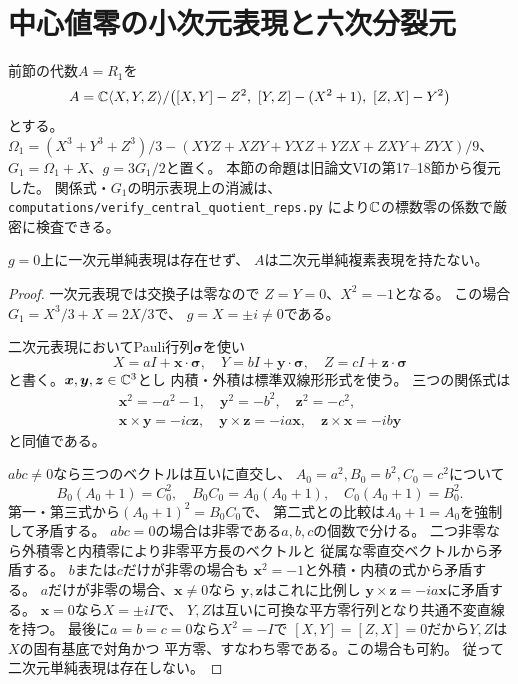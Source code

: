 \section{中心値零の小次元表現と六次分裂元}
\label{sec:central-quotient-representations}

前節の代数$A=R_1$を
\[
 A=\mathbb C\langle X,Y,Z\rangle/
 \bigl([X,Y]-Z^2,\ [Y,Z]-(X^2+1),\ [Z,X]-Y^2\bigr)
\]
とする。$\Omega_1=(X^3+Y^3+Z^3)/3
-(XYZ+XZY+YXZ+YZX+ZXY+ZYX)/9$、
$G_1=\Omega_1+X$、$g=3G_1/2$と置く。
本節の命題は旧論文VIの第17--18節から復元した。
関係式・$G_1$の明示表現上の消滅は、
\texttt{computations/verify\_central\_quotient\_reps.py}
により$\mathbb C$の標数零の係数で厳密に検査できる。

\begin{proposition}[一次・二次元単純表現の不存在]
\label{prop:local-no-small-simples}
$g=0$上に一次元単純表現は存在せず、
$A$は二次元単純複素表現を持たない。
\end{proposition}
\begin{proof}
一次元表現では交換子は零なので
$Z=Y=0$、$X^2=-1$となる。
この場合$G_1=X^3/3+X=2X/3$で、
$g=X=\pm i\ne0$である。

二次元表現においてPauli行列$\boldsymbol{\sigma}$を使い
\[
 X=aI+\boldsymbol x\cdot\boldsymbol{\sigma},\quad
 Y=bI+\boldsymbol y\cdot\boldsymbol{\sigma},\quad
 Z=cI+\boldsymbol z\cdot\boldsymbol{\sigma}
\]
と書く。$\boldsymbol{x},\boldsymbol{y},\boldsymbol{z}\in\mathbb C^3$とし
内積・外積は標準双線形形式を使う。
三つの関係式は
\[
 \begin{gathered}
 \boldsymbol x^2=-a^2-1,\quad
 \boldsymbol y^2=-b^2,\quad
 \boldsymbol z^2=-c^2,\\
 \boldsymbol x\times\boldsymbol y=-ic\boldsymbol z,\quad
 \boldsymbol y\times\boldsymbol z=-ia\boldsymbol x,\quad
 \boldsymbol z\times\boldsymbol x=-ib\boldsymbol y
 \end{gathered}
\]
と同値である。

$abc\ne0$なら三つのベクトルは互いに直交し、
$A_0=a^2,B_0=b^2,C_0=c^2$について
\[
 B_0(A_0+1)=C_0^2,\quad
 B_0C_0=A_0(A_0+1),\quad
 C_0(A_0+1)=B_0^2.
\]
第一・第三式から$(A_0+1)^2=B_0C_0$で、
第二式との比較は$A_0+1=A_0$を強制して矛盾する。
$abc=0$の場合は非零である$a,b,c$の個数で分ける。
二つ非零なら外積零と内積零により非零平方長のベクトルと
従属な零直交ベクトルから矛盾する。
$b$または$c$だけが非零の場合も
$\boldsymbol x^2=-1$と外積・内積の式から矛盾する。
$a$だけが非零の場合、$\boldsymbol x\ne0$なら
$\boldsymbol y,\boldsymbol z$はこれに比例し
$\boldsymbol y\times\boldsymbol z=-ia\boldsymbol x$に矛盾する。
$\boldsymbol x=0$なら$X=\pm iI$で、
$Y,Z$は互いに可換な平方零行列となり共通不変直線を持つ。
最後に$a=b=c=0$なら$X^2=-I$で
$[X,Y]=[Z,X]=0$だから$Y,Z$は$X$の固有基底で対角かつ
平方零、すなわち零である。この場合も可約。
従って二次元単純表現は存在しない。
\end{proof}

